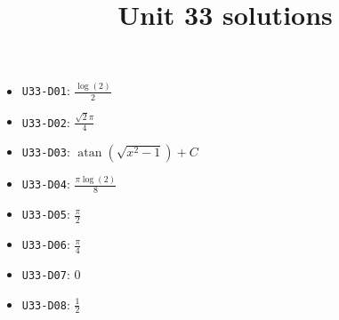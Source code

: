 \title{Unit 33 solutions}\maketitle\begin{itemize}
  \item \texttt{U33-D01}: $\frac{\log{\left(2 \right)}}{2}$
  \item \texttt{U33-D02}: $\frac{\sqrt{2} \pi}{4}$
  \item \texttt{U33-D03}: $\operatorname{atan}{\left(\sqrt{x^{2} - 1} \right)}+C$
  \item \texttt{U33-D04}: $\frac{\pi \log{\left(2 \right)}}{8}$
  \item \texttt{U33-D05}: $\frac{\pi}{2}$
  \item \texttt{U33-D06}: $\frac{\pi}{4}$
  \item \texttt{U33-D07}: $0$
  \item \texttt{U33-D08}: $\frac{1}{2}$
\end{itemize}
